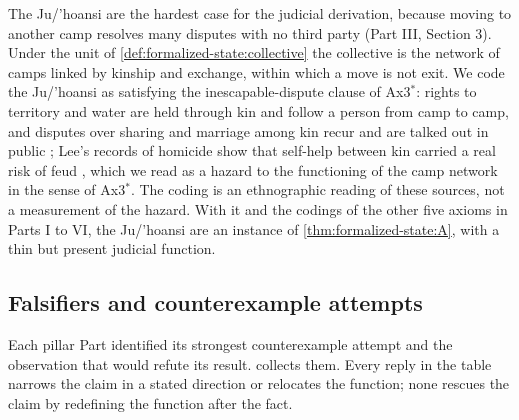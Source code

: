 \documentclass[11pt,letterpaper]{article}
\theoremstyle{definition}
\theoremstyle{remark}
\begin{document}
The Ju/'hoansi are the hardest case for the judicial derivation, because moving to another camp resolves many disputes with no third party (Part III, Section 3). Under the unit of \cref{def:formalized-state:collective} the collective is the network of camps linked by kinship and exchange, within which a move is not exit. We code the Ju/'hoansi as satisfying the inescapable-dispute clause of Ax3$^{*}$: rights to territory and water are held through kin and follow a person from camp to camp, and disputes over sharing and marriage among kin recur and are talked out in public \citep{lee2013,wiessner2005}; Lee's records of homicide show that self-help between kin carried a real risk of feud \citep{lee1979}, which we read as a hazard to the functioning of the camp network in the sense of Ax3$^{*}$. The coding is an ethnographic reading of these sources, not a measurement of the hazard. With it and the codings of the other five axioms in Parts I to VI, the Ju/'hoansi are an instance of \cref{thm:formalized-state:A}, with a thin but present judicial function.

\subsection{Falsifiers and counterexample attempts}

Each pillar Part identified its strongest counterexample attempt and the observation that would refute its result.  collects them. Every reply in the table narrows the claim in a stated direction or relocates the function; none rescues the claim by redefining the function after the fact.
\end{document}
